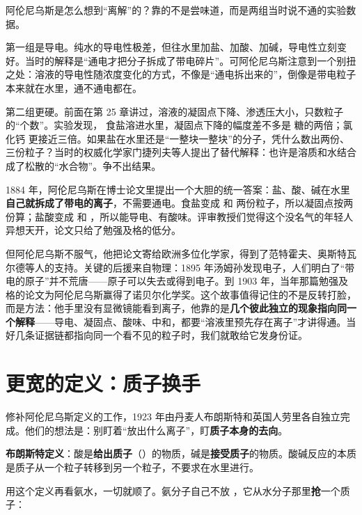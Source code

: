 \begin{zhengju}
阿伦尼乌斯是怎么想到“离解”的？靠的不是尝味道，而是两组当时说不通的实验数据。

第一组是导电。纯水的导电性极差，但往水里加盐、加酸、加碱，导电性立刻变好。当时的解释是“通电才把分子拆成了带电碎片”。可阿伦尼乌斯注意到一个别扭之处：溶液的导电性随浓度变化的方式，不像是“通电拆出来的”，倒像是带电粒子本来就在水里，通不通电都在。

第二组更硬。前面在第 25 章讲过，溶液的凝固点下降、渗透压大小，只数粒子的“个数”。实验发现， 食盐溶进水里，凝固点下降的幅度差不多是  糖的两倍；氯化钙  更接近三倍。如果盐在水里还是“一整块一整块”的分子，凭什么数出两份、三份粒子？当时的权威化学家门捷列夫等人提出了替代解释：也许是溶质和水结合成了松散的“水合物”。争不出结果。

1884 年，阿伦尼乌斯在博士论文里提出一个大胆的统一答案：盐、酸、碱在水里\textbf{自己就拆成了带电的离子}，不需要通电。食盐变成  和  两份粒子，所以凝固点按两份算；盐酸变成  和 ，所以能导电、有酸味。评审教授们觉得这个没名气的年轻人异想天开，论文只给了勉强及格的低分。

但阿伦尼乌斯不服气，他把论文寄给欧洲多位化学家，得到了范特霍夫、奥斯特瓦尔德等人的支持。关键的后援来自物理：1895 年汤姆孙发现电子，人们明白了“带电的原子”并不荒唐——原子可以失去或得到电子。到 1903 年，当年那篇勉强及格的论文为阿伦尼乌斯赢得了诺贝尔化学奖。这个故事值得记住的不是反转打脸，而是方法：他手里没有显微镜能看到离子，他靠的是\textbf{几个彼此独立的现象指向同一个解释}——导电、凝固点、酸味、中和，都要“溶液里预先存在离子”才讲得通。当好几条证据链都指向同一个看不见的粒子时，我们就敢给它发身份证。
\end{zhengju}

\section{更宽的定义：质子换手}

修补阿伦尼乌斯定义的工作，1923 年由丹麦人布朗斯特和英国人劳里各自独立完成。他们的想法是：别盯着“放出什么离子”，盯\textbf{质子本身的去向}。

\begin{qiaoliang}
\textbf{布朗斯特定义}：酸是\textbf{给出质子}（）的物质，碱是\textbf{接受质子}的物质。酸碱反应的本质是质子从一个粒子转移到另一个粒子，不要求在水里进行。
\end{qiaoliang}

用这个定义再看氨水，一切就顺了。氨分子自己不放 ，它从水分子那里\textbf{抢}一个质子：

